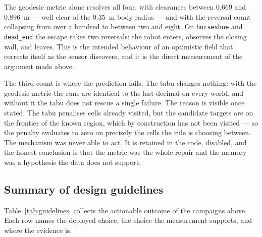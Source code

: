 \documentclass[11pt,a4paper]{article}
\begin{document}
The geodesic metric alone resolves all four, with clearances between $0.669$ and $0.896$~m --- well clear of
the $0.35$~m body radius --- and with the reversal count collapsing from over a hundred to between two and
eight. On \texttt{horseshoe} and \texttt{dead\_end} the escape takes two reversals: the robot enters, observes
the closing wall, and leaves. This is the intended behaviour of an optimistic field that corrects itself as
the sensor discovers, and it is the direct measurement of the argument made above.

The third count is where the prediction fails. The tabu changes nothing: with the geodesic metric the runs
are identical to the last decimal on every world, and without it the tabu does not rescue a single failure.
The reason is visible once stated. The tabu penalises cells already visited, but the candidate targets are on
the frontier of the known region, which by construction has not been visited --- so the penalty evaluates to
zero on precisely the cells the rule is choosing between. The mechanism was never able to act. It is retained
in the code, disabled, and the honest conclusion is that the metric was the whole repair and the memory was a
hypothesis the data does not support.

\subsection{Summary of design guidelines}
\label{sec:guidelines}

Table~\ref{tab:guidelines} collects the actionable outcome of the campaigns above. Each row names the
deployed choice, the choice the measurement supports, and where the evidence is.
\end{document}
